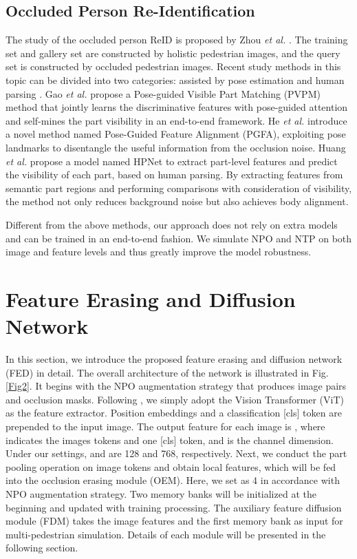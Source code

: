 \documentclass[10pt,twocolumn,letterpaper]{article}
\begin{document}
\subsection{Occluded Person Re-Identification}
The study of the occluded person ReID is proposed by Zhou \emph{et al.} \cite{zhuo2018occluded}. The training set and gallery set are constructed by holistic pedestrian images, and the query set is constructed by occluded pedestrian images. Recent study methods in this topic can be divided into two categories: assisted by pose estimation \cite{he2019foreground,he2020guided} and human parsing \cite{huang2020human,yu2021neighbourhood}.
Gao \emph{et al.} propose a Pose-guided Visible Part Matching (PVPM) method that jointly learns the discriminative features with pose-guided attention and self-mines the part visibility in an end-to-end framework. He \emph{et al.} \cite{he2020guided} introduce a novel method named Pose-Guided Feature Alignment (PGFA), exploiting pose landmarks to disentangle the useful information from the occlusion noise.
Huang \emph{et al.} propose a model named HPNet to extract part-level features and predict the visibility of each part, based on human parsing. By extracting features from semantic part regions and performing comparisons with consideration of visibility, the method not only reduces background noise but also achieves body alignment.


Different from the above methods, our approach does not rely on extra models and can be trained in an end-to-end fashion. We simulate NPO and NTP on both image and feature levels and thus greatly improve the model robustness.


\section{Feature Erasing and Diffusion Network}
In this section, we introduce the proposed feature erasing and diffusion network (FED) in detail. The overall architecture of the network is illustrated in Fig.\ref{Fig2}. 
It begins with the NPO augmentation strategy that produces image pairs and occlusion masks. Following \cite{he2021transreid}, we simply adopt the Vision Transformer (ViT)\cite{dosovitskiy2020image} as the feature extractor. Position embeddings and a classification [cls] token are prepended to the input image. 
The output feature for each image is , where  indicates the images tokens and one [cls] token, and  is the channel dimension. Under our settings,  and  are 128 and 768, respectively. 
Next, we conduct the part pooling operation on image tokens and obtain  local features, which will be fed into the occlusion erasing module (OEM). Here, we set  as 4 in accordance with NPO augmentation strategy. Two memory banks will be initialized at the beginning and updated with training processing. The auxiliary feature diffusion module (FDM) takes the image features and the first memory bank as input for multi-pedestrian simulation. Details of each module will be presented in the following section. 
\end{document}
